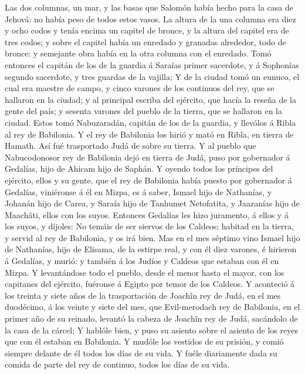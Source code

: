  Las dos columnas, un mar, y las basas que Salomón había
hecho para la casa de Jehová: no había peso de todos estos vasos.
 La altura de la una columna era diez y ocho codos y tenía
encima un capitel de bronce, y la altura del capitel era de tres codos;
y sobre el capitel había un enredado y granadas alrededor, todo de
bronce: y semejante obra había en la otra columna con el enredado.
 Tomó entonces el capitán de los de la guardia á Saraías
primer sacerdote, y á Sophonías segundo sacerdote, y tres guardas de la
vajilla;  Y de la ciudad tomó un eunuco, el cual era
maestre de campo, y cinco varones de los continuos del rey, que se
hallaron en la ciudad; y al principal escriba del ejército, que hacía la
reseña de la gente del país; y sesenta varones del pueblo de la tierra,
que se hallaron en la ciudad.  Estos tomó Nabuzaradán,
capitán de los de la guardia, y llevólos á Ribla al rey de Babilonia.
 Y el rey de Babilonia los hirió y mató en Ribla, en tierra
de Hamath. Así fué trasportado Judá de sobre su tierra.  Y
al pueblo que Nabucodonosor rey de Babilonia dejó en tierra de Judá,
puso por gobernador á Gedalías, hijo de Ahicam hijo de Saphán.
 Y oyendo todos los príncipes del ejército, ellos y su
gente, que el rey de Babilonia había puesto por gobernador á Gedalías,
viniéronse á él en Mizpa, es á saber, Ismael hijo de Nathanías, y
Johanán hijo de Carea, y Saraía hijo de Tanhumet Netofatita, y Jaazanías
hijo de Maachâti, ellos con los suyos.  Entonces Gedalías
les hizo juramento, á ellos y á los suyos, y díjoles: No temáis de ser
siervos de los Caldeos; habitad en la tierra, y servid al rey de
Babilonia, y os irá bien.  Mas en el mes séptimo vino
Ismael hijo de Nathanías, hijo de Elisama, de la estirpe real, y con él
diez varones, é hirieron á Gedalías, y murió: y también á los Judíos y
Caldeos que estaban con él en Mizpa.  Y levantándose todo
el pueblo, desde el menor hasta el mayor, con los capitanes del
ejército, fuéronse á Egipto por temor de los Caldeos.  Y
aconteció á los treinta y siete años de la trasportación de Joachîn rey
de Judá, en el mes duodécimo, á los veinte y siete del mes, que
Evil-merodach rey de Babilonia, en el primer año de su reinado, levantó
la cabeza de Joachîn rey de Judá, sacándolo de la casa de la cárcel;
 Y hablóle bien, y puso su asiento sobre el asiento de los
reyes que con él estaban en Babilonia.  Y mudóle los
vestidos de su prisión, y comió siempre delante de él todos los días de
su vida.  Y fuéle diariamente dada su comida de parte del
rey de continuo, todos los días de su vida.
